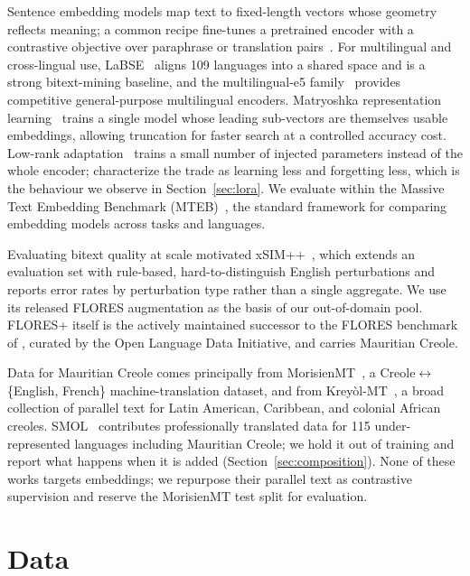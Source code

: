 \documentclass[11pt]{article}
\begin{document}
Sentence embedding models map text to fixed-length vectors whose geometry reflects meaning; a common
recipe fine-tunes a pretrained encoder with a contrastive objective over paraphrase or translation
pairs~\citep{reimers2019sbert}. For multilingual and cross-lingual use, LaBSE~\citep{feng2022labse}
aligns 109 languages into a shared space and is a strong bitext-mining baseline, and the
multilingual-e5 family~\citep{wang2024me5} provides competitive general-purpose multilingual
encoders. Matryoshka representation learning~\citep{kusupati2022matryoshka} trains a single model
whose leading sub-vectors are themselves usable embeddings, allowing truncation for faster search at
a controlled accuracy cost. Low-rank adaptation~\citep{hu2022lora} trains a small number of injected
parameters instead of the whole encoder; \citet{biderman2024lora} characterize the trade as learning
less and forgetting less, which is the behaviour we observe in Section~\ref{sec:lora}. We evaluate
within the Massive Text Embedding Benchmark (MTEB)~\citep{muennighoff2023mteb}, the standard
framework for comparing embedding models across tasks and languages.

Evaluating bitext quality at scale motivated xSIM++~\citep{chen2023xsimpp}, which extends an
evaluation set with rule-based, hard-to-distinguish English perturbations and reports error rates by
perturbation type rather than a single aggregate. We use its released FLORES augmentation as the
basis of our out-of-domain pool. FLORES+ itself is the actively maintained successor to the FLORES
benchmark of \citet{nllb2024}, curated by the Open Language Data Initiative, and carries Mauritian
Creole.

Data for Mauritian Creole comes principally from MorisienMT~\citep{dabre2022morisienmt}, a
Creole$\leftrightarrow$\{English, French\} machine-translation dataset, and from
Kreyòl-MT~\citep{robinson2024kreyolmt}, a broad collection of parallel text for Latin American,
Caribbean, and colonial African creoles. SMOL~\citep{caswell2025smol} contributes professionally
translated data for 115 under-represented languages including Mauritian Creole; we hold it out of
training and report what happens when it is added (Section~\ref{sec:composition}). None of these
works targets embeddings; we repurpose their parallel text as contrastive supervision and reserve the
MorisienMT test split for evaluation.

\section{Data}
\label{sec:data}
\end{document}
